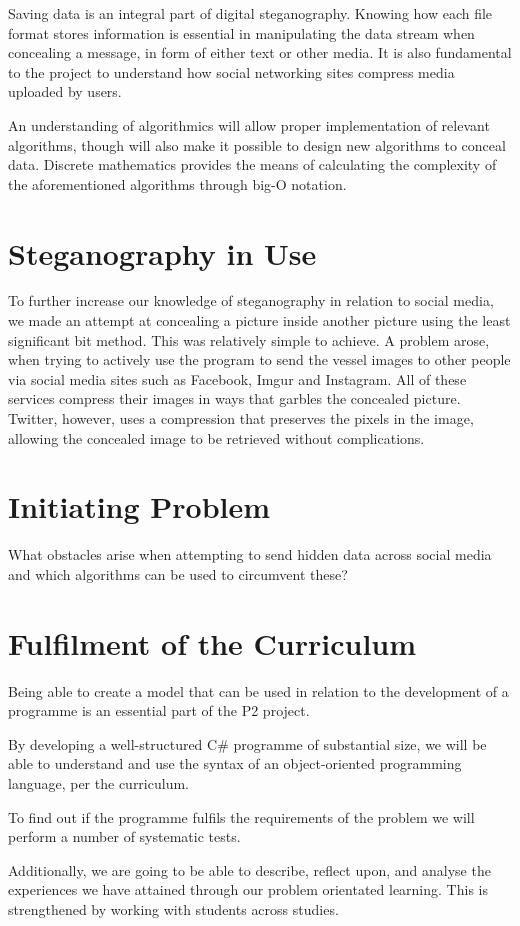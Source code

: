 \documentclass[a4paper,12pt,hidelinks]{article}
\begin{document}
Saving data is an integral part of digital steganography. Knowing how each file format stores information is essential in manipulating the data stream when concealing a message, in form of either text or other media. 
It is also fundamental to the project to understand how social networking sites compress media uploaded by users.

An understanding of algorithmics will allow proper implementation of relevant algorithms, though will also make it possible to design new algorithms to conceal data. Discrete mathematics provides the means of calculating the complexity of the aforementioned algorithms through big-O notation.

	\section*{Steganography in Use}
To further increase our knowledge of steganography in relation to social media, we made an attempt at concealing a picture inside another picture using the least significant bit method. This was relatively simple to achieve. A problem arose, when trying to actively use the program to send the vessel images to other people via social media sites such as Facebook, Imgur and Instagram. All of these services compress their images in ways that garbles the concealed picture. Twitter, however, uses a compression that preserves the pixels in the image, allowing the concealed image to be retrieved without complications.

	\section*{Initiating Problem}
What obstacles arise when attempting to send hidden data across social media and which algorithms can be used to circumvent these?

	\section*{Fulfilment of the Curriculum}
Being able to create a model that can be used in relation to the development of a programme is an essential part of the P2 project. 

By developing a well-structured C\# programme of substantial size, we will be able to understand and use the syntax of an object-oriented programming language, per the curriculum.

To find out if the programme fulfils the requirements of the problem we will perform a number of systematic tests.

Additionally, we are going to be able to describe, reflect upon, and analyse the experiences we have attained through our problem orientated learning. This is strengthened by working with students across studies.

 
\end{document}
